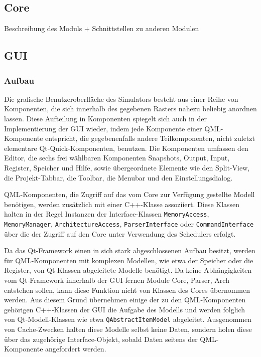 



\subsection{Core}

Beschreibung des Moduls + Schnittstellen zu anderen Modulen

\subsection{GUI}


\subsubsection{Aufbau}

Die grafische Benutzeroberfläche des Simulators besteht aus einer Reihe von Komponenten, die sich innerhalb des gegebenen Rasters nahezu beliebig anordnen lassen. Diese Aufteilung in Komponenten spiegelt sich auch in der Implementierung der GUI wieder, indem jede Komponente einer QML-Komponente entspricht, die gegebenenfalls andere Teilkomponenten, nicht zuletzt elementare Qt-Quick-Komponenten, benutzen. Die Komponenten umfassen den Editor, die sechs frei wählbaren Komponenten Snapshots, Output, Input, Register, Speicher und Hilfe, sowie übergeordnete Elemente wie den Split-View, die Projekt-Tabbar, die Toolbar, die Menubar und den Einstellungsdialog.

QML-Komponenten, die Zugriff auf das vom Core zur Verfügung gestellte Modell benötigen, werden zusätzlich mit einer C++-Klasse assoziiert. Diese Klassen halten in der Regel Instanzen der Interface-Klassen \texttt{MemoryAccess}, \texttt{MemoryManager}, \texttt{ArchitectureAccess}, \texttt{ParserInterface} oder \texttt{CommandInterface}  über die der Zugriff auf den Core unter Verwendung des Schedulers erfolgt.

Da das Qt-Framework einen in sich stark abgeschlossenen Aufbau besitzt, werden für QML-Komponenten mit komplexen Modellen, wie etwa der Speicher oder die Register, von Qt-Klassen abgeleitete Modelle benötigt. Da keine Abhängigkeiten vom Qt-Framework innerhalb der GUI-fernen Module Core, Parser, Arch entstehen sollen, kann diese Funktion nicht von Klassen des Cores übernommen werden. Aus diesem Grund übernehmen einige der zu den QML-Komponenten gehörigen C++-Klassen der GUI die Aufgabe des Modells und werden folglich von Qt-Modell-Klassen wie etwa \texttt{QAbstractItemModel} abgeleitet. Ausgenommen von Cache-Zwecken halten diese Modelle selbst keine Daten, sondern holen diese über das zugehörige Interface-Objekt, sobald Daten seitens der QML-Komponente angefordert werden.

